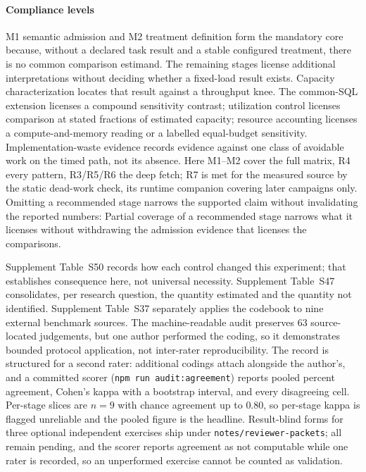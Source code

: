 \documentclass[11pt,a4paper]{article}
\begin{document}
\paragraph{Compliance levels} M1 semantic admission and M2 treatment definition form the mandatory core because, without a declared task result and a stable configured treatment, there is no common comparison estimand. The remaining stages license additional interpretations without deciding whether a fixed-load result exists. Capacity characterization locates that result against a throughput knee. The common-SQL extension licenses a compound sensitivity contrast; utilization control licenses comparison at stated fractions of estimated capacity; resource accounting licenses a compute-and-memory reading or a labelled equal-budget sensitivity. Implementation-waste evidence records evidence against one class of avoidable work on the timed
path, not its absence. Here M1--M2 cover the full matrix, R4 every pattern, R3/R5/R6 the deep fetch; R7 is met for the measured source by the static dead-work check, its runtime companion covering later campaigns only. Omitting a recommended stage narrows the supported claim without invalidating the reported numbers: Partial coverage of a recommended stage narrows what it licenses without withdrawing the admission evidence that licenses the comparisons.

\smallskip
Supplement Table~S50 records how each control changed this experiment; that establishes consequence here, not universal necessity. Supplement Table~S47 consolidates, per research question, the quantity estimated and the quantity not identified. Supplement Table~S37 separately applies the codebook to nine external benchmark sources. The machine-readable audit preserves 63 source-located judgements, but one author performed the coding, so it demonstrates bounded protocol application, not inter-rater reproducibility. The record is structured for a second rater: additional codings attach alongside the author's, and a committed scorer (\texttt{npm run audit:agreement}) reports pooled percent agreement, Cohen's kappa with a bootstrap interval, and every disagreeing cell. Per-stage slices are $n{=}9$ with chance agreement up to $0.80$, so per-stage kappa is flagged unreliable and the pooled figure is the headline. Result-blind forms for three optional independent exercises ship under \texttt{notes/reviewer-packets}; all remain pending, and the scorer reports agreement as not computable while one rater is recorded, so an unperformed exercise cannot be counted as validation.
\end{document}
